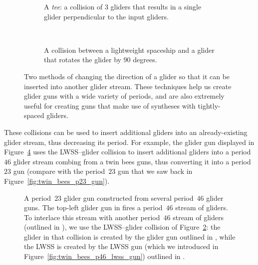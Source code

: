 \begin{figure}[!htb]
	\centering
	\begin{subfigure}{.48\textwidth}
		\centering
		\caption{A \emph{tee}: a collision of $3$ gliders that results in a single glider perpendicular to the input gliders.}
		\label{fig:tee}
	\end{subfigure} \ \ \ \ %
	\begin{subfigure}{.48\textwidth}
		\centering
		\caption{A collision between a lightweight spaceship and a glider that rotates the glider by $90$ degrees.}
		\label{fig:lwss_reflect_glider}
	\end{subfigure}
	\caption{Two methods of changing the direction of a glider so that it can be inserted into another glider stream. These techniques help us create glider guns with a wide variety of periods, and are also extremely useful for creating guns that make use of syntheses with tightly-spaced gliders.}\label{fig:glider_insert_methods}
\end{figure}

These collisions can be used to insert additional gliders into an already-existing glider stream, thus decreasing its period. For example, the glider gun displayed in Figure~\ref{fig:p23_gun} uses the LWSS--glider collision to insert additional gliders into a period~$46$ glider stream combing from a twin bees guns, thus converting it into a period~$23$ gun (compare with the period~$23$ gun that we saw back in Figure~\ref{fig:twin_bees_p23_gun}).

\begin{figure}[!ht]
	\centering
	\caption{A period~$23$ glider gun constructed from several period~$46$ glider guns. The top-left glider gun in  fires a period~$46$ stream of gliders. To interlace this stream with another period~$46$ stream of gliders (outlined in ), we use the LWSS--glider collision of Figure~\ref{fig:lwss_reflect_glider}: the glider in that collision is created by the glider gun outlined in , while the LWSS is created by the LWSS gun (which we introduced in Figure~\ref{fig:twin_bees_p46_lwss_gun}) outlined in .}\label{fig:p23_gun}
\end{figure}

